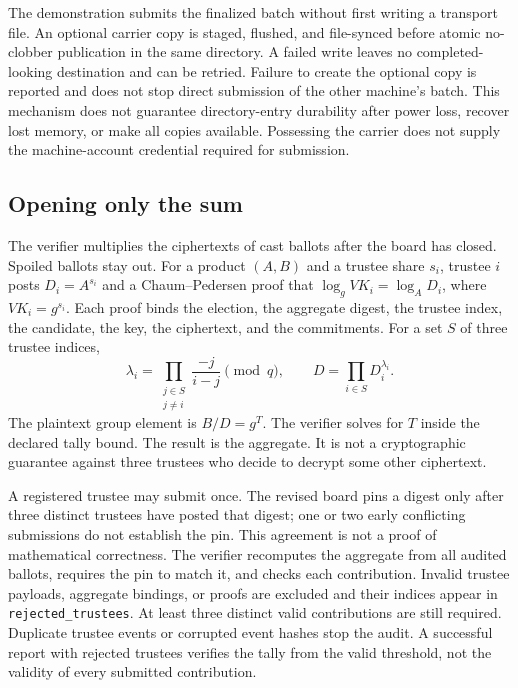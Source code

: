 \documentclass[11pt]{article}
\begin{document}
The demonstration submits the finalized batch without first writing a transport file. An optional carrier copy is staged, flushed, and file-synced before atomic no-clobber publication in the same directory. A failed write leaves no completed-looking destination and can be retried. Failure to create the optional copy is reported and does not stop direct submission of the other machine's batch. This mechanism does not guarantee directory-entry durability after power loss, recover lost memory, or make all copies available. Possessing the carrier does not supply the machine-account credential required for submission.

\subsection{Opening only the sum}
The verifier multiplies the ciphertexts of cast ballots after the board has closed. Spoiled ballots stay out. For a product $(A,B)$ and a trustee share $s_i$, trustee $i$ posts $D_i=A^{s_i}$ and a Chaum--Pedersen proof that $\log_g VK_i=\log_A D_i$, where $VK_i=g^{s_i}$. Each proof binds the election, the aggregate digest, the trustee index, the candidate, the key, the ciphertext, and the commitments. For a set $S$ of three trustee indices,
\begin{equation}
  \lambda_i=\prod_{\substack{j\in S\\ j\ne i}}\frac{-j}{i-j}\pmod{q},
  \qquad D=\prod_{i\in S} D_i^{\lambda_i}.
\end{equation}
The plaintext group element is $B/D=g^T$. The verifier solves for $T$ inside the declared tally bound. The result is the aggregate. It is not a cryptographic guarantee against three trustees who decide to decrypt some other ciphertext.

A registered trustee may submit once. The revised board pins a digest only after three distinct trustees have posted that digest; one or two early conflicting submissions do not establish the pin. This agreement is not a proof of mathematical correctness. The verifier recomputes the aggregate from all audited ballots, requires the pin to match it, and checks each contribution. Invalid trustee payloads, aggregate bindings, or proofs are excluded and their indices appear in \texttt{rejected\_trustees}. At least three distinct valid contributions are still required. Duplicate trustee events or corrupted event hashes stop the audit. A successful report with rejected trustees verifies the tally from the valid threshold, not the validity of every submitted contribution.
\end{document}

